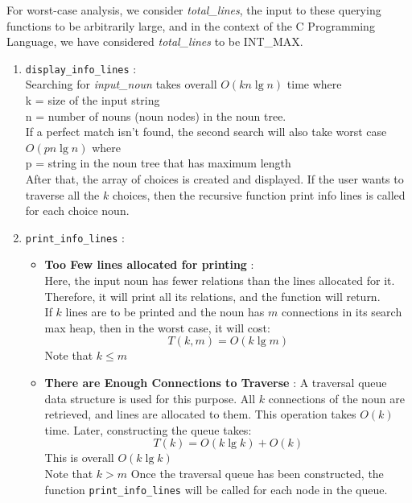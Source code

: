 \documentclass[conference]{IEEEtran}
\begin{document}
For worst-case analysis, we consider \textit{total\_lines}, the input to these querying functions to be arbitrarily large, and in the context of the C Programming Language, we have considered \textit{total\_lines} to be INT\_MAX.

\begin{enumerate}
    \item \texttt{display\_info\_lines} :
    \\Searching for \textit{input\_noun} takes overall $O(kn \lg n)$  time where 
    \\k = size of the input string
    \\n = number of nouns (noun nodes) in the noun tree.
    \\If a perfect match isn’t found, the second search will also
take worst case  $O(pn \lg n)$ where
    \\p = string in the noun tree that has maximum length
    \\After that, the array of choices is created and displayed. If
the user wants to traverse all the $k$ choices, then the recursive
function print info lines is called for each choice noun.
    \item \texttt{print\_info\_lines} :
    \begin{itemize}
        \item \textbf{Too Few lines allocated for printing} :
        \\Here, the input noun has fewer relations than the lines
allocated for it. Therefore, it will print all its relations,
and the function will return. 
\\If $k$ lines are to be printed
and the noun has $m$ connections in its search max heap,
then in the worst case, it will cost:
\begin{equation}
	T(k, m) = O(k\lg m)
\end{equation}
Note that $k \leq m$
\item \textbf{There are Enough Connections to Traverse} : 
A traversal queue data structure is used for this purpose.
All $k$ connections of the noun are retrieved, and lines are
allocated to them. This operation takes $O(k)$ time. Later,
constructing the queue takes:
\begin{equation}
    T(k) = O(k\lg k) + O(k)
\end{equation}
This is overall $O(k\lg k)$
\\Note that $k > m$
Once the traversal queue has been constructed, the function \texttt{print\_info\_lines} will be called for each node
in the queue.


\end{itemize}
\end{enumerate}
\end{document}
